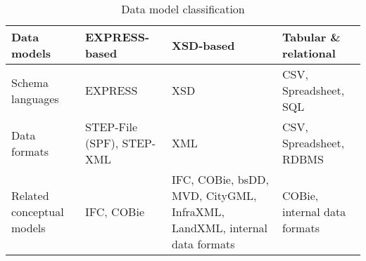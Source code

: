 \begin{table}\footnotesize
    \centering
    \caption{Data model classification}
    \label{tab:data-model-classification}
    
    
    
    \begin{tabulary}{\columnwidth}{p{0.2\columnwidth}p{0.2\columnwidth}p{0.2\columnwidth}p{0.2\columnwidth}}
        \hline
            Data models      &
            EXPRESS-based   &
            XSD-based       &
            Tabular \& \newline relational
        \\
        \hline
            Schema \newline languages &
            EXPRESS & XSD   &
            CSV, \newline Spreadsheet, \newline SQL
        \\
            Data formats &
            STEP-File (SPF),    \newline STEP-XML &
            XML &
            CSV, \newline   Spreadsheet,    \newline RDBMS
        \\            
            Related \newline conceptual \newline models   &
            IFC, \newline COBie &
            IFC, \newline COBie, \newline bsDD, \newline MVD, \newline CityGML, \newline InfraXML, \newline LandXML, \newline internal \newline data \newline formats &
            COBie, \newline internal \newline data \newline formats
        \\
        \hline
    \end{tabulary}
\end{table}






